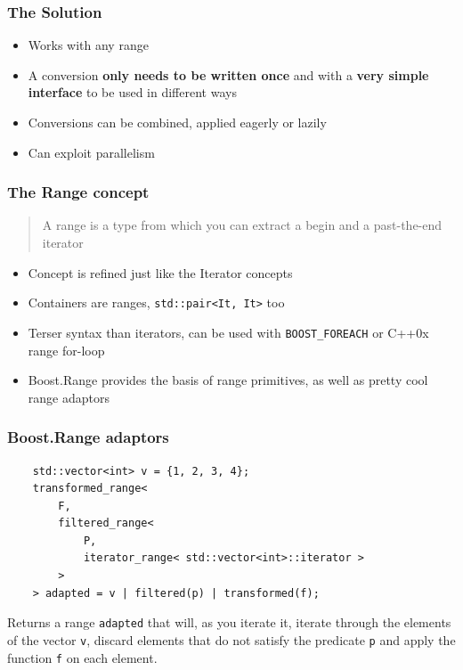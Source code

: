 \documentclass{beamer}
\begin{document}
\begin{frame}
	\frametitle{The Solution}
	
	\begin{itemize}
		\item Works with any range
		\item A conversion \textbf{only needs to be written once} and with a \textbf{very simple interface} to be used in different ways
		\item Conversions can be combined, applied eagerly or lazily
		\item Can exploit parallelism
	\end{itemize}
	
\end{frame}

\begin{frame}[fragile]
	\frametitle{The Range concept}
	
	\begin{quote}
	A range is a type from which you can extract a begin and a past-the-end iterator
	\end{quote}	
	
	\begin{itemize}
		\item Concept is refined just like the Iterator concepts
		\item Containers are ranges, \lstinline{std::pair<It, It>} too
		\item Terser syntax than iterators, can be used with \lstinline{BOOST_FOREACH} or C++0x range for-loop
		\item Boost.Range provides the basis of range primitives, as well as pretty cool range adaptors
	\end{itemize}

\end{frame}

\begin{frame}[fragile]
	\frametitle{Boost.Range adaptors}
	
	\begin{lstlisting}
	std::vector<int> v = {1, 2, 3, 4};
	transformed_range<
	    F,
	    filtered_range<
	        P,
	        iterator_range< std::vector<int>::iterator >
	    >
	> adapted = v | filtered(p) | transformed(f);
	\end{lstlisting}
	\bigskip
	
	Returns a range \lstinline{adapted} that will, as you iterate it, iterate through the elements of the vector \lstinline{v}, discard elements that do not satisfy the predicate \lstinline{p} and apply the function \lstinline{f} on each element.
	
\end{frame}
\end{document}
